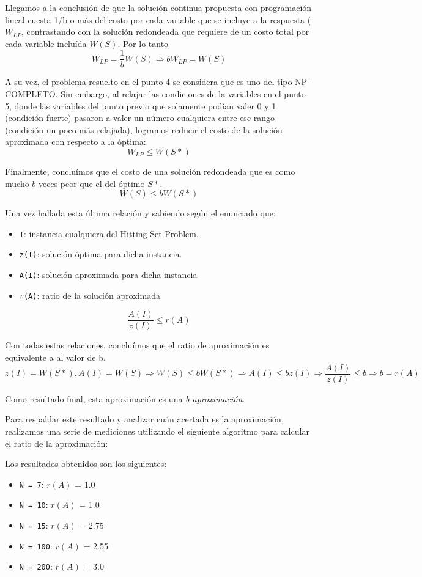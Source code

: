 Llegamos a la conclusión de que la solución continua propuesta con programación lineal cuesta 1/b o más del costo por cada variable que se incluye a la respuesta ($W_{LP}$, contrastando con la solución redondeada que requiere de un costo total por cada variable incluída $W(S)$. Por lo tanto
\[ W_{LP} = \dfrac{1}{b} W(S) \Rightarrow b W_{LP} = W(S) \]

A su vez, el problema resuelto en el punto 4 se considera que es uno del tipo NP-COMPLETO. Sin embargo, al relajar las condiciones de la variables en el punto 5, donde las variables del punto previo que solamente podían valer 0 y 1 (condición fuerte) pasaron a valer un número cualquiera entre ese rango (condición un poco más relajada), logramos reducir el costo de la solución aproximada con respecto a la óptima:
\[ W_{LP} \leq W(S*) \]

Finalmente, concluímos que el costo de una solución redondeada que es como mucho $b$ veces peor que el del óptimo $S*$.
\[ W(S) \leq b W(S*) \]

Una vez hallada esta última relación y sabiendo según el enunciado que:
\begin{itemize}
    \item \texttt{I}: instancia cualquiera del Hitting-Set Problem.
    \item \texttt{z(I)}: solución óptima para dicha instancia.
    \item \texttt{A(I)}: solución aproximada para dicha instancia
    \item \texttt{r(A)}: ratio de la solución aproximada
\end{itemize}

\[ \dfrac{A(I)}{z(I)} \leq r(A) \]

Con todas estas relaciones, concluímos que el ratio de aproximación es equivalente a al valor de b.
\[ z(I) = W(S*), A(I) = W(S) \Rightarrow W(S) \leq b W(S*) \Rightarrow A(I) \leq b z(I) \Rightarrow \dfrac{A(I)}{z(I)} \leq b \Rightarrow b = r(A) \]

Como resultado final, esta aproximación es una \textit{b-aproximación}.

Para respaldar este resultado y analizar cuán acertada es la aproximación, realizamos
una serie de mediciones utilizando el siguiente algoritmo para calcular el ratio de la
aproximación:



Los resultados obtenidos son los siguientes:
\begin{itemize}
	\item \texttt{N = 7}: $r(A)$ = 1.0
	\item \texttt{N = 10}: $r(A)$ = 1.0
	\item \texttt{N = 15}: $r(A)$ = 2.75
	\item \texttt{N = 100}: $r(A)$ = 2.55
	\item \texttt{N = 200}: $r(A)$ = 3.0
\end{itemize}

